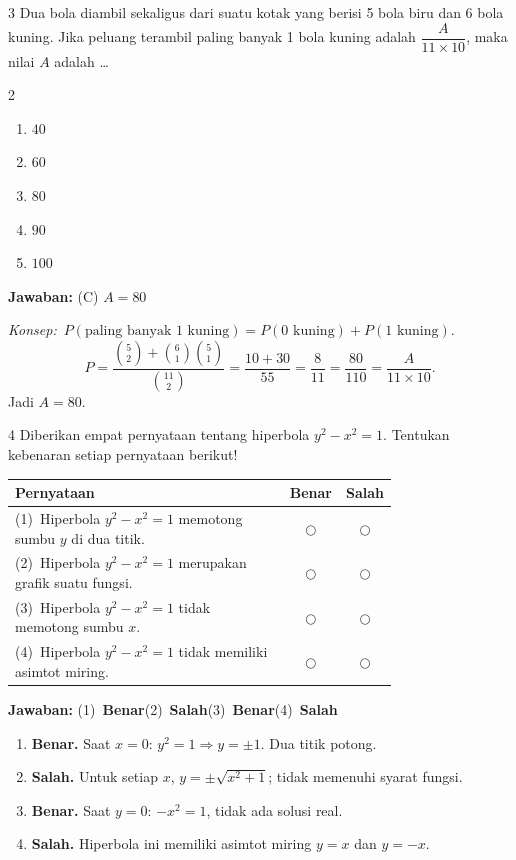 \documentclass[11pt]{article}
\newcommand{\jawaban}[1]{%
  \noindent\colorbox{gold!30}{\parbox{\dimexpr\linewidth-2\fboxsep\relax}{%
    \textbf{Jawaban:} #1}}\par\smallskip}
\newcommand{\konsep}{\noindent\textit{Konsep:}\ \ignorespaces}
\newenvironment{pilB}{%
  \par\smallskip\begin{multicols}{2}
  \begin{enumerate}[label=(\Alph*),leftmargin=*,itemsep=1pt,topsep=3pt]}%
  {\end{enumerate}\end{multicols}}
\begin{document}
\begin{soal}{3}
Dua bola diambil sekaligus dari suatu kotak yang berisi 5 bola biru
dan 6 bola kuning. Jika peluang terambil paling banyak 1 bola kuning
adalah $\dfrac{A}{11\times10}$, maka nilai $A$ adalah \ldots
\begin{pilB}
  \item $40$ \item $60$ \item $80$ \item $90$ \item $100$
\end{pilB}
\end{soal}
\begin{pembox}
\jawaban{(C) $A=80$}
\konsep $P(\text{paling banyak 1 kuning})=P(0\text{ kuning})+P(1\text{ kuning})$.
\[ P=\frac{\binom{5}{2}+\binom{6}{1}\binom{5}{1}}{\binom{11}{2}}=\frac{10+30}{55}=\frac{8}{11}=\frac{80}{110}=\frac{A}{11\times10}. \]
Jadi $A=80$.
\end{pembox}

\begin{soal}{4}
Diberikan empat pernyataan tentang hiperbola $y^2-x^2=1$.
Tentukan kebenaran setiap pernyataan berikut!

\par\smallskip
{\renewcommand{\arraystretch}{1.4}%
\begin{tabular}{@{}p{0.76\linewidth}cc@{}}
\hline
\textbf{Pernyataan} & \textbf{Benar} & \textbf{Salah}\\
\hline
(1)~Hiperbola $y^2-x^2=1$ memotong sumbu $y$ di dua titik.
  & $\bigcirc$ & $\bigcirc$\\
(2)~Hiperbola $y^2-x^2=1$ merupakan grafik suatu fungsi.
  & $\bigcirc$ & $\bigcirc$\\
(3)~Hiperbola $y^2-x^2=1$ tidak memotong sumbu $x$.
  & $\bigcirc$ & $\bigcirc$\\
(4)~Hiperbola $y^2-x^2=1$ tidak memiliki asimtot miring.
  & $\bigcirc$ & $\bigcirc$\\
\hline
\end{tabular}}
\end{soal}
\begin{pembox}
\jawaban{(1)~\textbf{Benar}\quad(2)~\textbf{Salah}\quad(3)~\textbf{Benar}\quad(4)~\textbf{Salah}}
\begin{enumerate}[leftmargin=*,topsep=3pt,itemsep=3pt]
\item \textbf{Benar.} Saat $x=0$: $y^2=1\Rightarrow y=\pm1$. Dua titik potong.
\item \textbf{Salah.} Untuk setiap $x$, $y=\pm\sqrt{x^2+1}$; tidak memenuhi syarat fungsi.
\item \textbf{Benar.} Saat $y=0$: $-x^2=1$, tidak ada solusi real.
\item \textbf{Salah.} Hiperbola ini memiliki asimtot miring $y=x$ dan $y=-x$.
\end{enumerate}
\end{pembox}
\end{document}
